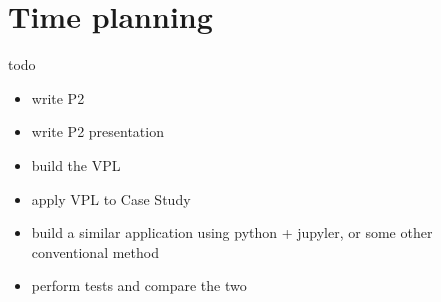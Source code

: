 \newpage
\section{Time planning}

todo
\begin{itemize}
    \item write P2
    \item write P2 presentation
    \item build the VPL
    \item apply VPL to Case Study
    \item build a similar application using python + jupyler, or some other conventional method
    \item perform tests and compare the two
\end{itemize}




